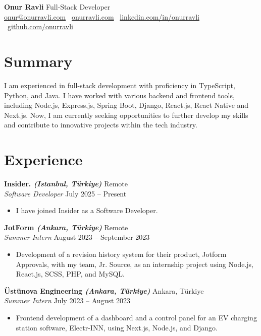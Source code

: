 \documentclass[10pt,a4paper]{extarticle}
\begin{document}
\begin{center}
    \begin{minipage}{\textwidth}
        \centering
        {\LARGE\textbf{Onur Ravli}} \hspace{2pt} {\LARGE{Full-Stack Developer}}\\[10pt]
        \href{mailto:onur@onurravli.com}{onur@onurravli.com} \textbullet\
        \href{https://onurravli.com}{onurravli.com} \textbullet\
        \href{https://linkedin.com/in/onurravli}{linkedin.com/in/onurravli} \textbullet\
        \href{https://github.com/onurravli}{github.com/onurravli}
    \end{minipage}
\end{center}
\section{Summary}
I am experienced in full-stack development with proficiency in TypeScript, Python, and Java. I have worked
with various backend and frontend tools, including Node.js, Express.js, Spring Boot, Django, React.js, React
Native and Next.js. Now, I am currently seeking opportunities to further develop my skills and contribute to
innovative projects within the tech industry.
\section{Experience}
\textbf{Insider. \textit{(Istanbul, Türkiye)}} \hfill Remote\\
\textit{Software Developer} \hfill July 2025 -- Present
\begin{itemize}[leftmargin=*,noitemsep,topsep=0pt]
    \item I have joined Insider as a Software Developer.
\end{itemize}
\textbf{JotForm \textit{(Ankara, Türkiye)}} \hfill Remote\\
\textit{Summer Intern} \hfill August 2023 -- September 2023
\begin{itemize}[leftmargin=*,noitemsep,topsep=0pt]
    \item Development of a revision history system for their product, Jotform Approvals, with my team, Jr. Source, as an internship project using Node.js, React.js, SCSS, PHP, and MySQL.
\end{itemize}
\textbf{Üstünova Engineering \textit{(Ankara, Türkiye)}} \hfill Ankara, Türkiye\\
\textit{Summer Intern} \hfill July 2023 -- August 2023
\begin{itemize}[leftmargin=*,noitemsep,topsep=0pt]
    \item Frontend development of a dashboard and a control panel for an EV charging station software, Electr-INN, using Next.js, Node.js, and Django.
\end{itemize}
\end{document}
